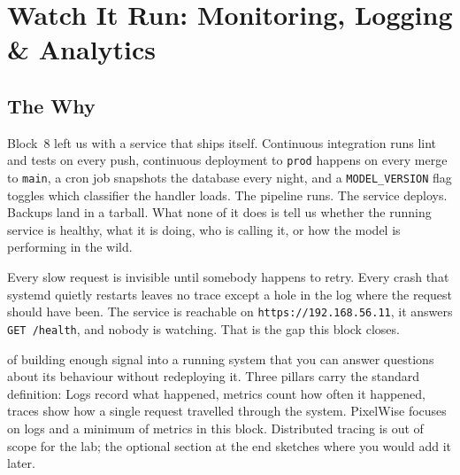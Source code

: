 

\chapter{Watch It Run: Monitoring, Logging \& Analytics}


\section{The Why}

Block~8 left us with a service that ships itself. Continuous integration
runs lint and tests on every push, continuous deployment to \texttt{prod}
happens on every merge to \texttt{main}, a cron job snapshots the
database every night, and a \texttt{MODEL\_VERSION} flag toggles which
classifier the handler loads. The pipeline runs. The service deploys.
Backups land in a tarball. What none of it does is tell us whether the
running service is healthy, what it is doing, who is calling it, or how
the model is performing in the wild.

Every slow request is invisible until somebody happens to retry. Every
crash that systemd quietly restarts leaves no trace except a hole in the
log where the request should have been. The service is reachable on
\texttt{https://192.168.56.11}, it answers \texttt{GET /health}, and
nobody is watching. That is the gap this block closes.

 of building enough signal into
a running system that you can answer questions about its behaviour
without redeploying it. Three pillars carry the standard
definition: Logs record what happened, metrics
count how often it happened, traces show how a single request travelled
through the system. PixelWise focuses on logs and a minimum of metrics
in this block. Distributed tracing is out of scope for the lab; the
optional section at the end sketches where you would add it later.

